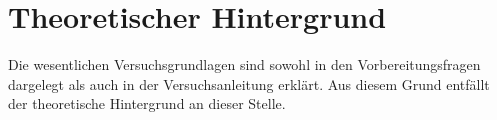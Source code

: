 \section{Theoretischer Hintergrund}
Die wesentlichen Versuchsgrundlagen sind sowohl in den Vorbereitungsfragen dargelegt als auch in der Versuchsanleitung erklärt. Aus diesem Grund entfällt der theoretische Hintergrund an dieser Stelle.